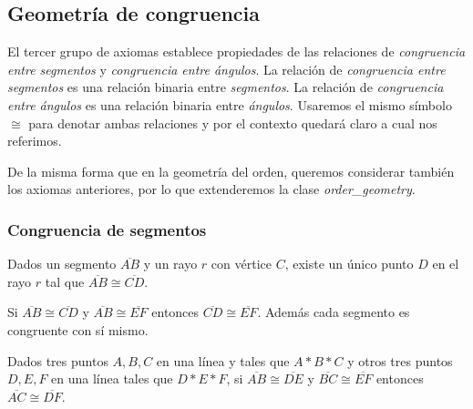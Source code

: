 \subsection{Geometría de congruencia}


El tercer grupo de axiomas establece propiedades de las relaciones de
\textit{congruencia entre segmentos} y \textit{congruencia entre ángulos}. La
relación de \textit{congruencia entre segmentos} es una relación binaria entre
\textit{segmentos}. La relación de \textit{congruencia entre ángulos} es una relación binaria entre
\textit{ángulos}. Usaremos el mismo símbolo $\cong$ para denotar ambas
relaciones y por el contexto quedará claro a cual nos referimos.

De la misma forma que en la geometría del orden, queremos considerar también los
axiomas anteriores, por lo que extenderemos la clase \textit{order_geometry}.



\subsubsection{Congruencia de segmentos}

\begin{ax}\label{C1}
	Dados un segmento $\overline{AB}$ y un rayo $r$ con vértice $C$, existe un
	único punto $D$ en el rayo $r$ tal que $\overline{AB}\cong\overline{CD}$.
\end{ax}


\begin{ax}\label{C2}
	Si $\overline{AB}\cong\overline{CD}$ y $\overline{AB}\cong\overline{EF}$
	entonces $\overline{CD}\cong\overline{EF}$. Además cada segmento es
	congruente con sí mismo.
\end{ax}


\begin{ax}[Suma]\label{C3}
	Dados tres puntos $A, B, C$ en una línea y tales que $A * B * C$ y otros
	tres puntos $D, E, F$ en una línea tales que $D * E * F$, si
	$\overline{AB}\cong\overline{DE}$ y $\overline{BC}\cong\overline{EF}$
	entonces $\overline{AC}\cong\overline{DF}$.
\end{ax}


